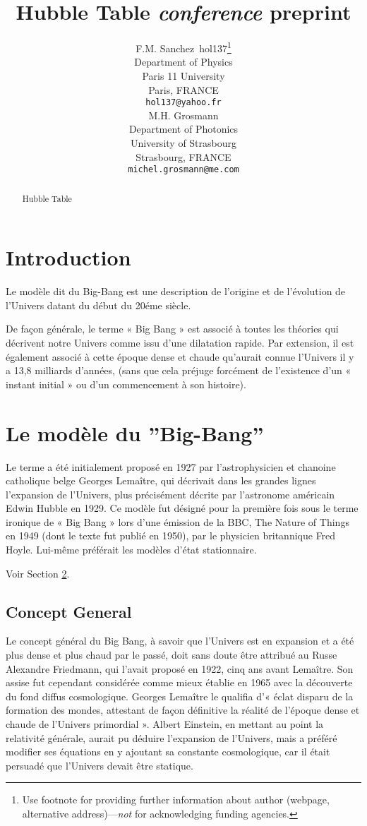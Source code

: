 \documentclass{article}
\title{Hubble Table \emph{conference} preprint}
\author{
  F.M. Sanchez~hol137\thanks{Use footnote for providing further
    information about author (webpage, alternative
    address)---\emph{not} for acknowledging funding agencies.} \\
  Department of Physics\\
  Paris 11 University\\
  Paris, FRANCE \\
  \texttt{hol137@yahoo.fr} \\
   \And
 M.H. Grosmann \\
  Department of Photonics\\
  University of Strasbourg\\
  Strasbourg, FRANCE \\
  \texttt{michel.grosmann@me.com} \\
}
\begin{document}
\maketitle

\begin{abstract}
Hubble Table
\end{abstract}




\section{Introduction}

Le modèle dit du Big-Bang est une description de l'origine et de l'évolution de l’Univers datant du début du 20éme siècle.

De façon générale, le terme « Big Bang » est associé à toutes les théories qui décrivent notre Univers comme issu d'une dilatation rapide. Par extension, il est également associé à cette époque dense et chaude qu’aurait connue l’Univers il y a 13,8 milliards d’années, (sans que cela préjuge forcément de l’existence d’un « instant initial » ou d’un commencement à son histoire).

\section{Le modèle du ”Big-Bang”}
\label{sec:headings}

Le terme a été initialement proposé en 1927 par l'astrophysicien  et chanoine catholique belge Georges Lemaître, qui décrivait dans les grandes lignes l’expansion de l'Univers, plus précisément décrite par l'astronome américain Edwin Hubble en 1929. Ce modèle fut désigné pour la première fois sous le terme ironique de « Big Bang » lors d’une émission de la BBC, The Nature of Things en 1949 (dont le texte fut publié en 1950), par le physicien britannique Fred Hoyle. Lui-même préférait les modèles d'état stationnaire.

Voir Section \ref{sec:headings}.

\subsection{Concept General}
Le concept général du Big Bang, à savoir que l’Univers est en expansion et a été plus dense et plus chaud par le passé, doit sans doute être attribué au Russe Alexandre Friedmann, qui l'avait proposé en 1922, cinq ans avant Lemaître. Son assise fut cependant considérée comme mieux établie en 1965 avec la découverte du fond diffus cosmologique. Georges Lemaître le qualifia d’« éclat disparu de la formation des mondes, attestant de façon définitive la réalité de l’époque dense et chaude de l’Univers primordial ». Albert Einstein, en mettant au point la relativité générale, aurait pu déduire l'expansion de l'Univers, mais a préféré modifier ses équations en y ajoutant sa constante cosmologique, car il était persuadé que l'Univers devait être statique.
\end{document}
